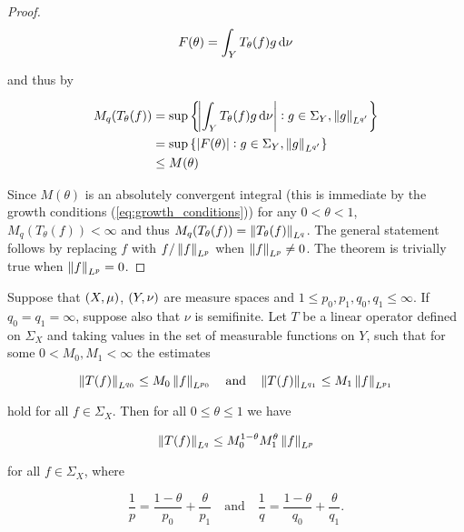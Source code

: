 \begin{proof}
	\begin{equation*}
		F(\theta) = \int_Y T_\theta(f)g\mathop{}\!\mathrm{d}\nu
	\end{equation*}

	\noindent and thus by \cite[189]{folland:real_analysis:1999} 

	\begin{gather*}
		\begin{aligned}
			M_q(T_\theta(f)) &= \sup\cbr[3]{ \abs[3]{ \int_Y T_\theta(f) g \d \nu} : g \in \Sigma_Y, \norm[0]{g}_{L^{q'}}}\\
			&= \sup\cbr[0]{ \abs[0]{ F(\theta)} : g \in \Sigma_Y, \norm[0]{ g }_{L^{q'}}}\\
			&\leq M(\theta)
		\end{aligned}
	\end{gather*}

	Since $M(\theta)$ is an absolutely convergent integral (this is immediate by the growth conditions (\ref{eq:growth_conditions})) for any $0 < \theta < 1$, $M_q(T_\theta(f)) < \infty$ and thus $M_q(T_\theta(f)) = \norm[0]{ T_\theta(f)}_{L^q}$. The general statement follows by replacing $f$ with $f/\norm[0]{ f}_{L^p}$ when $\norm[0]{f}_{L^p} \neq 0$. The theorem is trivially true when $\norm[0]{ f}_{L^p} = 0$.
\end{proof}

\begin{theorem}
		Suppose that $\del{X,\mu}$, $\del{Y,\nu}$ are measure spaces and $1 \leq p_0,p_1,q_0,q_1 \leq \infty$. If $q_0 = q_1 = \infty$, suppose also that $\nu$ is semifinite. Let $T$ be a linear operator defined on $\Sigma_X$ and taking values in the set of measurable functions on $Y$, such that for some $0 < M_0,M_1 < \infty$ the estimates 

		\begin{equation}
			\norm[0]{T(f)}_{L^{q_0}} \leq M_0\norm[0]{f}_{L^{p_0}} \quad \text{and} \quad \norm[0]{T(f)}_{L^{q_1}} \leq M_1\norm[0]{f}_{L^{p_1}}
			\label{hyp:Lq0Lq1}
		\end{equation}

		\noindent hold for all $f \in \Sigma_X$. Then for all $0 \leq \theta \leq 1$ we have

		\begin{equation}
			\norm[0]{T(f)}_{L^q} \leq M_0^{1 - \theta}M_1^\theta\norm[0]{f}_{L^p}
			\label{est:boundTf}
		\end{equation}

		\noindent for all $f \in \Sigma_X$, where

		\begin{equation*}
			\frac{1}{p} = \frac{1 - \theta}{p_0} + \frac{\theta}{p_1} \quad \text{and} \quad \frac{1}{q} = \frac{1 - \theta}{q_0} + \frac{\theta}{q_1}.
		\end{equation*}
		\label{thm:riesz_thorin_interpolation_theorem}
\end{theorem}

